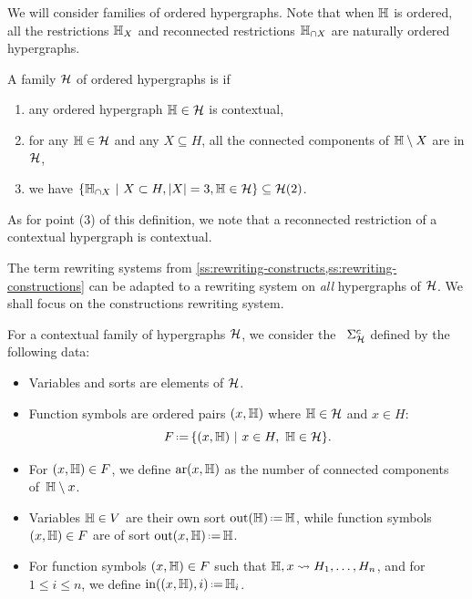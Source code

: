 We will consider families of ordered hypergraphs. 
Note that when ${\mathbb H}$ is ordered, all the restrictions ${\mathbb H}_X$ and reconnected restrictions ${\mathbb H}_{\cap X}$ are naturally ordered hypergraphs.

\begin{definition}
  \label{def:contextual-family}
    A family $\mathcal{H}$ of ordered hypergraphs is  if 
    \begin{enumerate}
      \item any ordered hypergraph ${\mathbb H} \in \mathcal{H}$ is contextual,
      \item for any ${\mathbb H} \in \mathcal{H}$ and any $X \subseteq H$, all the connected components of ${\mathbb H}\setminus X$ are in $\mathcal{H}$,
      \item we have $\{{\mathbb H}_{\cap X} \ | \ X \subset H, |X|=3, {\mathbb H} \in \mathcal{H} \} \subseteq \mathcal{H}(2)$.
    \end{enumerate}
\end{definition}
As for point (3) of this definition, we note that a reconnected restriction of a contextual hypergraph is contextual.

The term rewriting systems from \cref{ss:rewriting-constructs,ss:rewriting-constructions} can be adapted to a rewriting system on \emph{all} hypergraphs of $\mathcal{H}$.
We shall focus on the constructions rewriting system. 

\begin{definition}
  For a contextual family of hypergraphs $\mathcal{H}$, we consider the ~$\Sigma_{\mathcal{H}}^c$ defined by the following data:
  \begin{itemize}
    \item Variables and sorts are elements of $\mathcal{H}$.
    \item Function symbols are ordered pairs $(x,{\mathbb H})$ where ${\mathbb H} \in \mathcal{H}$ and $x\in H$:
    $$F\eqdef \{(x,\hyper{H}) \ | \ x \in H, \ \hyper{H} \in \calH \}.$$
    \item For $(x,{\mathbb H}) \in F$, we define $\mathrm{ar}(x,{\mathbb H})$ as the number of connected components of~${\mathbb H} \setminus {x}$.
    \item Variables ${\mathbb H} \in V$ are their own sort $\outsort(\hyper{H})\eqdef \hyper{H}$, while function symbols~$(x,{\mathbb H}) \in F$ are of sort $\outsort(x,\hyper{H})\eqdef \hyper{H}$.
    \item For function symbols $(x,{\mathbb H}) \in F$ such that ${\mathbb H},x \leadsto H_1,\ldots,H_n$, and for $1 \leq i \leq n$, we define $\insort((x,\hyper{H}),i)\eqdef \hyper{H}_i$.
  \end{itemize}
\end{definition}

